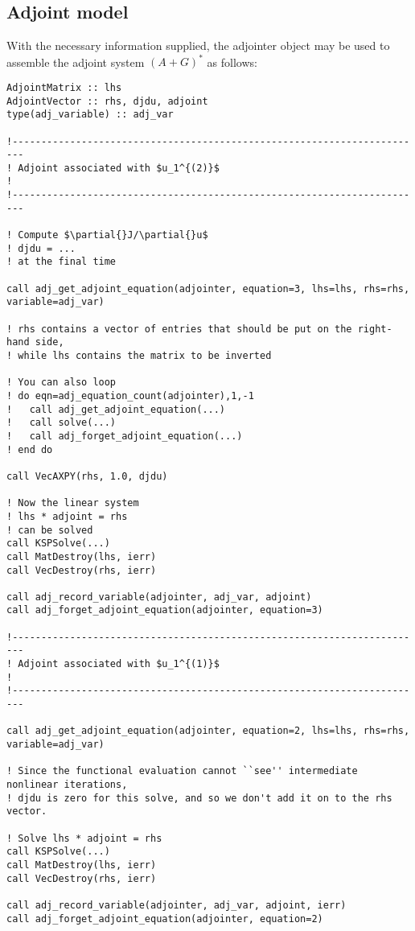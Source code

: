 \documentclass[10pt,authoryear]{elsarticle}
\begin{document}
\subsection{Adjoint model}
With the necessary information supplied, the adjointer object may be used to
assemble the adjoint system $(A+G)^{*}$ as follows:

\begin{verbatim}
AdjointMatrix :: lhs
AdjointVector :: rhs, djdu, adjoint
type(adj_variable) :: adj_var

!------------------------------------------------------------------------
! Adjoint associated with $u_1^{(2)}$                                           !
!------------------------------------------------------------------------

! Compute $\partial{}J/\partial{}u$
! djdu = ... 
! at the final time

call adj_get_adjoint_equation(adjointer, equation=3, lhs=lhs, rhs=rhs, variable=adj_var)

! rhs contains a vector of entries that should be put on the right-hand side,
! while lhs contains the matrix to be inverted

! You can also loop
! do eqn=adj_equation_count(adjointer),1,-1
!   call adj_get_adjoint_equation(...)
!   call solve(...)
!   call adj_forget_adjoint_equation(...)
! end do

call VecAXPY(rhs, 1.0, djdu)

! Now the linear system
! lhs * adjoint = rhs
! can be solved
call KSPSolve(...)
call MatDestroy(lhs, ierr)
call VecDestroy(rhs, ierr)

call adj_record_variable(adjointer, adj_var, adjoint)
call adj_forget_adjoint_equation(adjointer, equation=3)

!------------------------------------------------------------------------
! Adjoint associated with $u_1^{(1)}$                                           !
!------------------------------------------------------------------------

call adj_get_adjoint_equation(adjointer, equation=2, lhs=lhs, rhs=rhs, variable=adj_var)

! Since the functional evaluation cannot ``see'' intermediate nonlinear iterations,
! djdu is zero for this solve, and so we don't add it on to the rhs vector.

! Solve lhs * adjoint = rhs
call KSPSolve(...)
call MatDestroy(lhs, ierr)
call VecDestroy(rhs, ierr)

call adj_record_variable(adjointer, adj_var, adjoint, ierr)
call adj_forget_adjoint_equation(adjointer, equation=2)


\end{verbatim}
\end{document}
